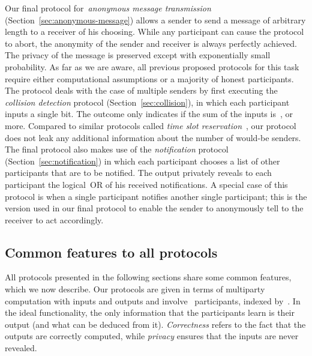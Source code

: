 \documentclass[11pt]{article}
\begin{document}
Our final protocol  for~\emph{anonymous message transmission}
(Section~\ref{sec:anonymous-message}) allows a sender to send a
message of arbitrary length to a receiver of his choosing. While any
participant can cause the protocol to abort, the anonymity of the
sender and receiver is always perfectly achieved. The privacy of the
message is preserved except with exponentially small probability. As
far as we are aware, all previous proposed protocols for this task
require either computational assumptions or a majority of honest
participants. The protocol deals with the case of multiple senders
by first executing the \emph{collision detection} protocol
(Section~\ref{sec:collision}), in which each participant inputs a
single bit. The outcome only indicates  if the sum of the inputs
is~,  or more. Compared to similar protocols called \emph{time
slot reservation}~\cite{Chaum88,WP89}, our protocol does not leak
any additional information about the number of would-be senders. The
final protocol also makes use of the \emph{notification} protocol
(Section~\ref{sec:notification}) in which each participant chooses a
list of other participants that are to be notified. The output
privately reveals to each participant the logical~OR of his received
notifications. A special case of this protocol is when a single
participant notifies another single participant; this is the version
used in our final protocol to enable the sender to anonymously tell
to the receiver to act accordingly.








\subsection{Common features to all protocols}

All protocols presented in the following sections share some common
features, which we now describe. Our protocols are given in terms of
multiparty computation with inputs and outputs and involve~
participants, indexed by~. In the ideal
functionality, the only information that the participants learn is
their output (and what can be deduced from it). \emph{Correctness}
refers to the fact that the outputs are correctly computed, while
\emph{privacy} ensures that the inputs are never revealed.
\end{document}
